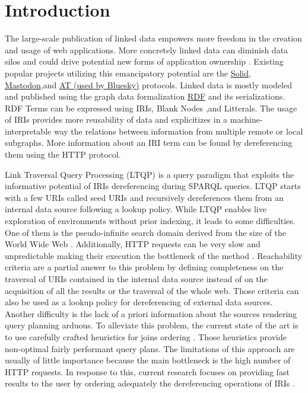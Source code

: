 
\section{Introduction}
 
The large-scale publication of linked data empowers more freedom in the creation and usage of web applications.
More concretely linked data can diminish data silos \cite{Verstraete2022}
and could drive potential new forms of application ownership \cite{Mechant2021}.
Existing popular projects utilizing this emancipatory potential are the \href{https://solidproject.org/TR/protocol}{Solid},
\href{https://docs.joinmastodon.org/}{Mastodon},and \href{https://atproto.com/}{AT (used by Bluesky)} protocols.
Linked data is mostly modeled and published using the graph data formalization \href{https://www.w3.org/TR/rdf12-concepts/}{RDF} and its serializations.
RDF Terms can be expressed using IRIs, Blank Nodes ,and Litterals.
The usage of IRIs provides more reusability of data and explicitizes in a machine-interpretable way the relations between
information from multiple remote or local subgraphs.
More information about an IRI term can be found by dereferencing them using the HTTP protocol.

Link Traversal Query Processing (LTQP) \cite{Hartig2012} is a query paradigm that exploits
the informative potential of IRIs dereferencing during SPARQL queries.
LTQP starts with a few URIs called seed URIs and recursively dereferences them from an internal data source following a lookup policy.
While LTQP enables live exploration of environments without prior indexing, it leads to some difficulties.
One of them is the pseudo-infinite search domain derived from the size of the World Wide Web \cite{Hartig2014}.
Additionally, HTTP requests can be very slow and unpredictable making their execution the bottleneck of the method \cite{hartig2016walking}.
Reachability criteria \cite{Hartig2012} are a partial answer to this problem by defining completeness on the traversal of URIs
contained in the internal data source instead of on the acquisition of all the results or the traversal of the whole web.
Those criteria can also be used as a lookup policy for dereferencing of external data sources.
Another difficulty is the lack of a priori information about the sources rendering query planning arduous.
To alleviate this problem, the current state of the art is to use carefully crafted heuristics for joins ordering \cite{Hartig2011, Hartig2014}.
Those heuristics provide non-optimal fairly performant query plans.
The limitations of this approach are usually of little importance because the main bottleneck is the high number of HTTP requests.
In response to this, current research focuses on providing fast results to the user by ordering adequately the dereferencing operations of IRIs \cite{hartig2016walking, Ladwig2010}.

